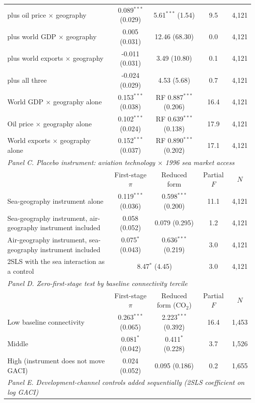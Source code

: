 \begin{table}[htbp]
\begin{threeparttable}
\begin{tabular}{lcccc}
  \quad plus oil price $\times$ geography & 0.089$^{***}$ (0.029) & 5.61$^{***}$ (1.54) & 9.5 & 4,121 \\
  \quad plus world GDP $\times$ geography & 0.005 (0.031) & 12.46 (68.30) & 0.0 & 4,121 \\
  \quad plus world exports $\times$ geography & -0.011 (0.031) & 3.49 (10.80) & 0.1 & 4,121 \\
  \quad plus all three & -0.024 (0.029) & 4.53 (5.68) & 0.7 & 4,121 \\
  World GDP $\times$ geography alone & 0.153$^{***}$ (0.038) & RF 0.887$^{***}$ (0.206) & 16.4 & 4,121 \\
  Oil price $\times$ geography alone & 0.102$^{***}$ (0.024) & RF 0.639$^{***}$ (0.138) & 17.9 & 4,121 \\
  World exports $\times$ geography alone & 0.152$^{***}$ (0.037) & RF 0.890$^{***}$ (0.202) & 17.1 & 4,121 \\
\midrule
\multicolumn{5}{l}{\textit{Panel C. Placebo instrument: aviation technology $\times$ 1996 sea market access}} \\
 & First-stage $\pi$ & Reduced form & Partial $F$ & $N$ \\
  Sea-geography instrument alone & 0.119$^{***}$ (0.036) & 0.598$^{***}$ (0.200) & 11.1 & 4,121 \\
  Sea-geography instrument, air-geography instrument included & 0.058 (0.052) & 0.079 (0.295) & 1.2 & 4,121 \\
  Air-geography instrument, sea-geography instrument included & 0.075$^{*}$ (0.043) & 0.636$^{***}$ (0.219) & 3.0 & 4,121 \\
  \quad 2SLS with the sea interaction as a control & \multicolumn{2}{c}{8.47$^{*}$ (4.45)} & 3.0 & 4,121 \\
\midrule
\multicolumn{5}{l}{\textit{Panel D. Zero-first-stage test by baseline connectivity tercile}} \\
 & First-stage $\pi$ & Reduced form (CO$_2$) & Partial $F$ & $N$ \\
  Low baseline connectivity & 0.263$^{***}$ (0.065) & 2.223$^{***}$ (0.392) & 16.4 & 1,453 \\
  Middle & 0.081$^{*}$ (0.042) & 0.411$^{*}$ (0.228) & 3.7 & 1,526 \\
  High (instrument does not move GACI) & 0.024 (0.052) & 0.095 (0.186) & 0.2 & 1,655 \\
\midrule
\multicolumn{5}{l}{\textit{Panel E. Development-channel controls added sequentially (2SLS coefficient on log GACI)}} \\

\end{tabular}
\end{threeparttable}
\end{table}
